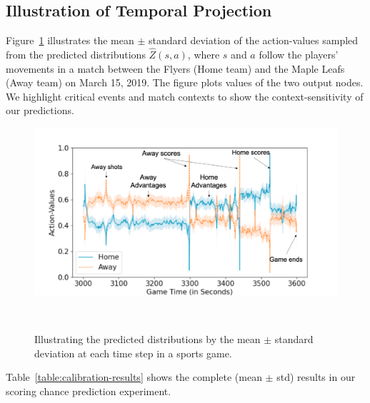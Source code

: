 \documentclass{article}
\newcommand{\state}{s}
\newcommand{\action}{a}
\begin{document}
\subsection{Illustration of Temporal Projection} Figure~\ref{fig:temporal-plot} illustrates the mean $\pm$ standard deviation of the action-values sampled from the predicted distributions $\hat{Z}(\state,\action)$, where $\state$ and $\action$ follow the players' movements in a match between the Flyers (Home team) and the Maple Leafs (Away team) on March 15, 2019. The figure plots values
of the two output nodes. We highlight critical events and
match contexts to show the context-sensitivity of our predictions. 
\begin{figure}[htbp]
    \centering
    \includegraphics[scale=0.4]{figures/temporal-visualization-marked.png}
    \caption{Illustrating the predicted distributions by the mean $\pm$ standard deviation at each time step in a sports game.}~\label{fig:temporal-plot}
\end{figure}

Table~\ref{table:calibration-results} shows the complete (mean $\pm$ std) results in our scoring chance prediction experiment.
\end{document}
